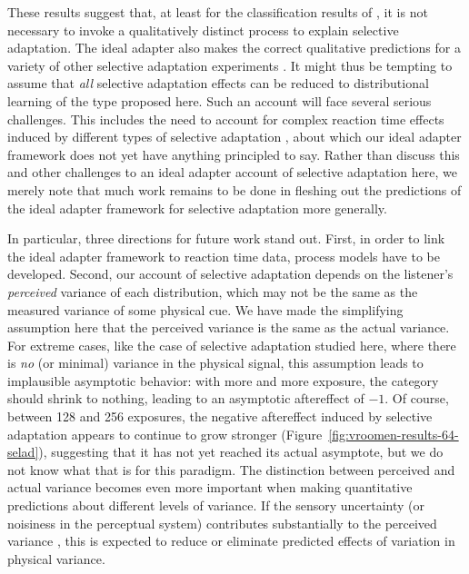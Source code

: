 These results suggest that, at least for the classification results of , it is not necessary to invoke a qualitatively distinct process to explain selective adaptation. The ideal adapter also makes the correct qualitative predictions for a variety of other selective adaptation experiments \autocite[e.g.,][]{Eimas1973,Miller1983}.  It might thus be tempting to assume that {\em all} selective adaptation effects can be reduced to distributional learning of the type proposed here. Such an account will face several serious challenges. This includes the need to account for complex reaction time effects induced by different types of selective adaptation \cite{Samuel1986,Samuel1996}, about which our ideal adapter framework does not yet have anything principled to say. Rather than discuss this and other challenges to an ideal adapter account of selective adaptation here, we merely note that much work remains to be done in fleshing out the predictions of the ideal adapter framework for selective adaptation more generally.

\label{r4-zerovar}
In particular, three directions for future work stand out.  First, in order to link the ideal adapter framework to reaction time data, process models have to be developed. Second, our account of selective adaptation depends on the listener's \emph{perceived} variance of each distribution, which may not be the same as the measured variance of some physical cue.  We have made the simplifying assumption here that the perceived variance is the same as the actual variance.  For extreme cases, like the case of selective adaptation studied here, where there is \emph{no} (or minimal) variance in the physical signal, this assumption leads to implausible asymptotic behavior: with more and more exposure, the category should shrink to nothing, leading to an asymptotic aftereffect of $-1$.  Of course, between 128 and 256 exposures, the negative aftereffect induced by selective adaptation appears to continue to grow stronger (Figure~\ref{fig:vroomen-results-64-selad}), suggesting that it has not yet reached its actual asymptote, but we do not know what that is for this paradigm.  The distinction between perceived and actual variance becomes even more important when making quantitative predictions about different levels of variance.  If the sensory uncertainty (or noisiness in the perceptual system) contributes substantially to the perceived variance \autocite[for preliminary evidence, see][]{Clayards2008,Feldman2009a,Kronrod2012}, this is expected to reduce or eliminate predicted effects of variation in physical variance.

